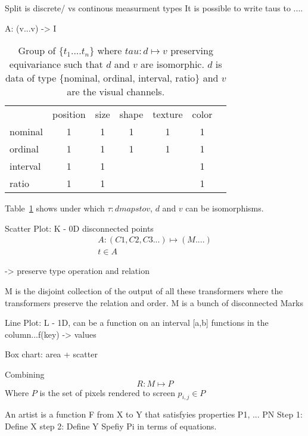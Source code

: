 Split is discrete/ vs continous measurment types 
It is possible to write taus to ....

A: (v...v) -> I

\begin{table}
    \label{tab:taus}
    \begin{tabular}{l*{6}{c}} 
                              & position      &  size        & shape        & texture     & color \\
    nominal                   &  1            &  1           & 1            & 1           & 1     \\ 
    ordinal                   &  1            &  1           & 1            & 1           & 1     \\
    interval                  &  1            &  1           &              &             & 1     \\   
    ratio                     &  1            &  1           &              &             & 1     \\  
    \end{tabular}
\caption{Group of $\{t_{1}....t_{n}\}$ where $tau: d \mapsto v$ preserving equivariance such that $d$ and $v$ are isomorphic. $d$ is data of type \{nominal, ordinal, interval, ratio\} and $v$ are the visual channels. \cite{bertinIIPropertiesGraphic2011,munznerMarksChannels}}
\end{table}
 

Table~\ref{tab:taus} shows under which $\tau: d maps to v$, $d$ and $v$ can be isomorphisms.


Scatter Plot:
K - 0D disconnected points
\begin{multline}
A: (C1, C2, C3...)\mapsto (M....)\\
t \in A 
\end{multline}

-> preserve type operation and relation

M is the disjoint collection of the output of all these transformers where the transformers preserve the relation and order. M is a bunch of disconnected Marks

Line Plot:
L - 1D, can be a function on an interval [a,b]
functions in the column...f(key) -> values

Box chart: area + scatter 


Combining 
\begin{equation}
    \label{eg:renderer}
    R: M \mapsto P
\end{equation}
Where $P$ is the set of pixels rendered to screen ${p_{i,j} \in P}$


An artist is a function F from X to Y
that satisfyies properties P1, ... PN
Step 1: Define X
step 2: Define Y
Spefiy Pi in terms of equations.

